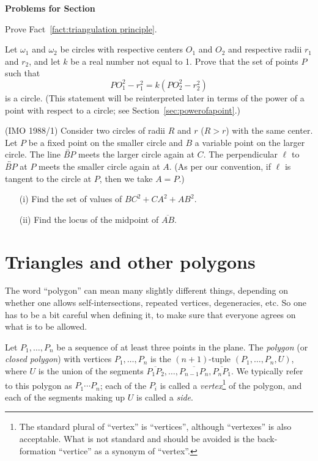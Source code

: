 \documentclass[12pt]{book}
\newcounter{exc}
\numberwithin{exc}{section}
\numberwithin{figure}{section}
\newenvironment{exer}{\vspace{0.1in}
\noindent \textbf{Problems for Section~\thesection} \vspace{0.1in}
\begin{list}{\arabic{exc}.}{\usecounter{exc}}}{\end{list}}
\numberwithin{equation}{theorem}
\def\ii{\item}
\def\line#1{\overleftrightarrow{#1}}
\def\seg#1{\overline{#1}}
\begin{document}
\begin{exer}
\ii
Prove Fact~\ref{fact:triangulation principle}.
\ii \label{ex:appower}
Let $\omega_1$ and $\omega_2$ be circles with respective centers
$O_1$ and $O_2$ and respective radii $r_1$ and $r_2$,
and let $k$ be a real number
not equal to 1. Prove that the set of points $P$ such that
\[
PO_1^2 - r_1^2 = k(PO_2^2 - r_2^2)
\]
is a circle. (This statement will be reinterpreted later in terms
of the power of a point  with respect to a circle;
see Section~\ref{sec:powerofapoint}.)
\ii (IMO 1988/1)
Consider two circles of radii $R$ and $r$ ($R > r$) with the same
center.  Let $P$ be a fixed point on the smaller circle and $B$ a variable
point on the larger circle.  The line $\line{BP}$ 
meets the larger circle again at
$C$.  The perpendicular $\ell$ to $\line{BP}$ at $P$ meets the smaller circle again at
$A$.  (As per our convention, if $\ell$ is tangent to the circle at $P$,
 then we take $A = P$.)
  \begin{enumerate}
  \item[(i)] Find the set of values of $BC^2 + CA^2 + AB^2$.
  \item[(ii)] Find the locus of the midpoint of $\seg{AB}$.
  \end{enumerate}
\end{exer}

\section{Triangles and other polygons}

The word ``polygon'' can mean many slightly different things, depending on
whether one allows self-intersections, repeated vertices, degeneracies,
etc. So one has to be a bit careful when defining it, to make sure that
everyone agrees on what is to be allowed.

Let $P_1,\dots, P_n$ be a sequence of at least three points in the plane.
The \emph{polygon} (or \emph{closed polygon})
 
 with vertices $P_1, \dots, P_n$
is the $(n+1)$-tuple $(P_1, \dots, P_n, U)$,
where $U$ is the
union of the segments
$\overline{P_1P_2}, \dots, \overline{P_{n-1}P_n}, \overline{P_nP_1}$.
We typically refer to this polygon as $P_1\cdots P_n$;
each of the $P_i$ is called 
a \emph{vertex}\footnote{The standard
plural of ``vertex'' is ``vertices'', although ``vertexes'' is also acceptable.
What is not standard and should be avoided 
is the back-formation ``vertice'' as a synonym of ``vertex''.}
of the polygon, and each of the segments making up $U$ is called a
\emph{side}. 
\end{document}
